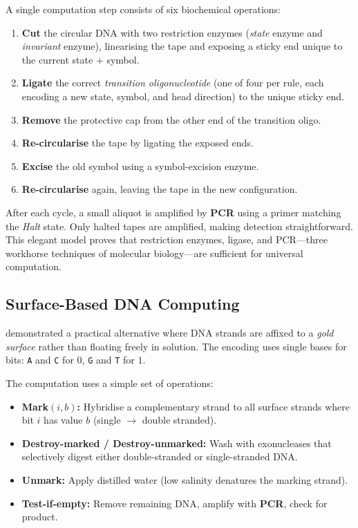 A single computation step consists of six biochemical operations:
\begin{enumerate}[leftmargin=1.8em]
  \item \textbf{Cut} the circular DNA with two restriction enzymes (\emph{state} enzyme and \emph{invariant} enzyme), linearising the tape and exposing a sticky end unique to the current state + symbol.
  \item \textbf{Ligate} the correct \emph{transition oligonucleotide} (one of four per rule, each encoding a new state, symbol, and head direction) to the unique sticky end.
  \item \textbf{Remove} the protective cap from the other end of the transition oligo.
  \item \textbf{Re-circularise} the tape by ligating the exposed ends.
  \item \textbf{Excise} the old symbol using a symbol-excision enzyme.
  \item \textbf{Re-circularise} again, leaving the tape in the new configuration.
\end{enumerate}

After each cycle, a small aliquot is amplified by \textbf{PCR} using a primer matching the \emph{Halt} state.  Only halted tapes are amplified, making detection straightforward.  This elegant model proves that restriction enzymes, ligase, and PCR---three workhorse techniques of molecular biology---are sufficient for universal computation.

\subsection{Surface-Based DNA Computing}

\citet{liu2000surface} demonstrated a practical alternative where DNA strands are affixed to a \emph{gold surface} rather than floating freely in solution.  The encoding uses single bases for bits: \texttt{A} and \texttt{C} for $0$, \texttt{G} and \texttt{T} for $1$.

The computation uses a simple set of operations:
\begin{itemize}[leftmargin=1.8em]
  \item \textbf{Mark$(i,b)$:} Hybridise a complementary strand to all surface strands where bit $i$ has value $b$ (single $\to$ double stranded).
  \item \textbf{Destroy-marked / Destroy-unmarked:} Wash with exonucleases that selectively digest either double-stranded or single-stranded DNA.
  \item \textbf{Unmark:} Apply distilled water (low salinity denatures the marking strand).
  \item \textbf{Test-if-empty:} Remove remaining DNA, amplify with \textbf{PCR}, check for product.
\end{itemize}

